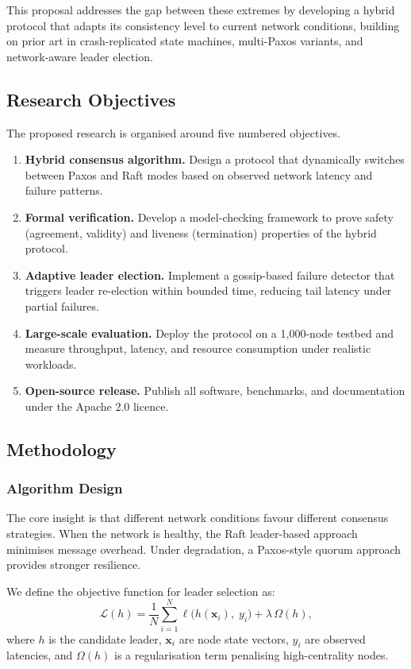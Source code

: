 \documentclass[
    language=english,
    doctype=grant-proposal,
    institution=none,
]{../../omnilatex}
\begin{document}
This proposal addresses the gap between these extremes by developing a
hybrid protocol that adapts its consistency level to current network
conditions, building on prior art in crash-replicated state machines,
multi-Paxos variants, and network-aware leader election.

\subsection{Research Objectives}
The proposed research is organised around five numbered objectives.
\begin{enumerate}
    \item \textbf{Hybrid consensus algorithm.} Design a protocol that
          dynamically switches between Paxos and Raft modes based on
          observed network latency and failure patterns.
    \item \textbf{Formal verification.} Develop a model-checking
          framework to prove safety (agreement, validity) and liveness
          (termination) properties of the hybrid protocol.
    \item \textbf{Adaptive leader election.} Implement a gossip-based
          failure detector that triggers leader re-election within
          bounded time, reducing tail latency under partial failures.
    \item \textbf{Large-scale evaluation.} Deploy the protocol on a
          1{,}000-node testbed and measure throughput, latency, and
          resource consumption under realistic workloads.
    \item \textbf{Open-source release.} Publish all software, benchmarks,
          and documentation under the Apache 2.0 licence.
\end{enumerate}

\subsection{Methodology}

\subsubsection{Algorithm Design}
The core insight is that different network conditions favour different
consensus strategies.  When the network is healthy, the Raft leader-based
approach minimises message overhead.  Under degradation, a Paxos-style
quorum approach provides stronger resilience.

We define the objective function for leader selection as:
\begin{equation}
    \mathcal{L}(h) = \frac{1}{N} \sum_{i=1}^{N}
    \ell\bigl(h(\mathbf{x}_i),\; y_i\bigr)
    + \lambda\, \Omega(h),
    \label{eq:objective}
\end{equation}
where $h$ is the candidate leader, $\mathbf{x}_i$ are node state vectors,
$y_i$ are observed latencies, and $\Omega(h)$ is a regularisation term
penalising high-centrality nodes.
\end{document}
